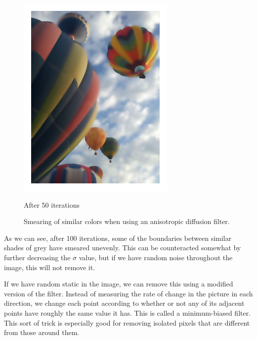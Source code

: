 \begin{figure}
\begin{minipage}[b]{0.45\linewidth}
\includegraphics[width=\textwidth]{figures/balloons_color_50iters.pdf}
\caption*{After 50 iterations}
\end{minipage}
\caption{Smearing of similar colors when using an anisotropic diffusion filter.}
\label{fig:anisdif_smearing}
\end{figure}

As we can see, after 100 iterations, some of the boundaries between similar shades of grey have smeared unevenly.
This can be counteracted somewhat by further decreasing the $\sigma$ value, but if we have random noise throughout the image, this will not remove it.

If we have random static in the image, we can remove this using a modified version of the filter.
Instead of measuring the rate of change in the picture in each direction, we change each point according to whether or not any of its adjacent points have roughly the same value it has.
This is called a minimum-biased filter.
This sort of trick is especially good for removing isolated pixels that are different from those around them.

